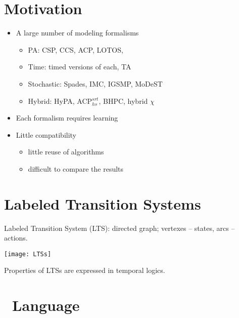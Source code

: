 \begin{slide}
\phantom{}
\vspace{3ex}

\maketitle

\newslide\section*{Motivation}
\begin{itemize}
\item A large number of modeling formalisms
  \begin{itemize}
  \item PA: CSP, CCS, ACP, LOTOS, \mcrl
  \item Time: timed versions of each, TA
  \item Stochastic: Spades, IMC, IGSMP, MoDeST
  \item Hybrid: HyPA, ACP$^{srt}_{hs}$, BHPC, hybrid $\chi$
  \end{itemize}
\item Each formalism requires learning
\item Little compatibility 
  \begin{itemize}
  \item little reuse of algorithms
  \item difficult to compare the results
  \end{itemize}
\end{itemize}
\newslide\section*{Labeled Transition Systems}
Labeled Transition System (LTS): directed graph; 
vertexes -- states, arcs -- actions.
\pause
\begin{center}
\texttt{[image: LTSs]}
\end{center}
\pause
Properties of LTSs are expressed in temporal logics.
\newslide\section*{\mcrl\ Language}

\end{slide}
